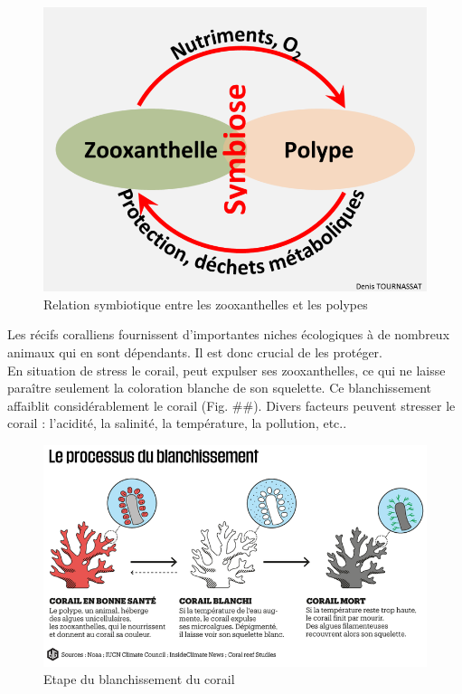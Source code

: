 \documentclass[]{report}
\begin{document}
\begin{figure}
\centering
\includegraphics{../image/symbiose.png}
\caption{Relation symbiotique entre les zooxanthelles et les polypes}
\end{figure}

Les récifs coralliens fournissent d'importantes niches écologiques à de
nombreux animaux qui en sont dépendants. Il est donc crucial de les
protéger.\\
En situation de stress le corail, peut expulser ses zooxanthelles, ce
qui ne laisse paraître seulement la coloration blanche de son squelette.
Ce blanchissement affaiblit considérablement le corail (Fig. \#\#).
Divers facteurs peuvent stresser le corail : l'acidité, la salinité, la
température, la pollution, etc..

\begin{figure}
\centering
\includegraphics{../image/blanchissement.png}
\caption{Etape du blanchissement du corail}
\end{figure}
\end{document}
